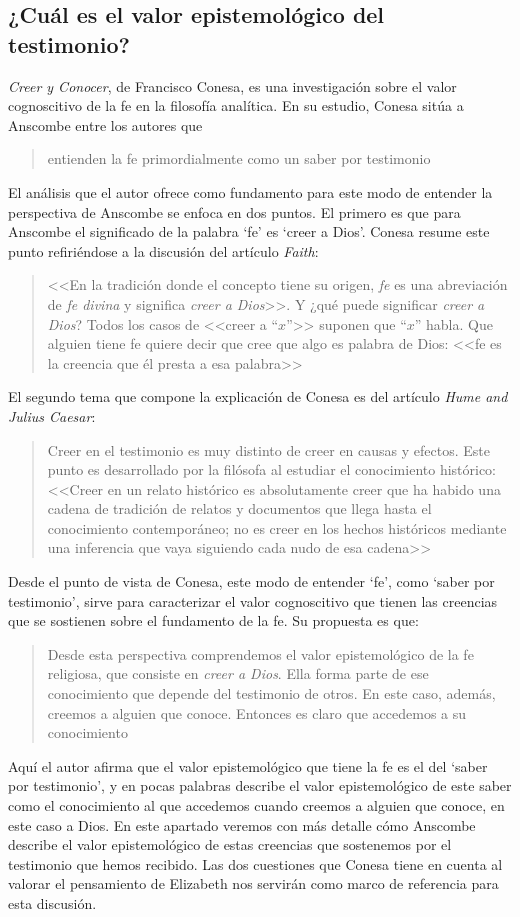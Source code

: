 \subsection{¿Cuál es el valor epistemológico del testimonio?}

\emph{Creer y Conocer}, de Francisco Conesa, es una investigación sobre el valor cognoscitivo de la fe en la filosofía analítica. En su estudio, Conesa sitúa a Anscombe entre los autores que \blockquote[{\cite[84]{conesa1994cc}}]{entienden la fe primordialmente como un saber por testimonio}. El análisis que el autor ofrece como fundamento para este modo de entender la perspectiva de Anscombe se enfoca en dos puntos. El primero es que para Anscombe el significado de la palabra `fe' es `creer a Dios'. Conesa resume este punto refiriéndose a la discusión del artículo \emph{Faith}: \blockquote[{\cite[87-88]{conesa1994cc}}]{<<En la tradición donde el concepto tiene su origen, \emph{fe} es una abreviación de \emph{fe divina} y significa \emph{creer a Dios}>>. Y ¿qué puede significar \emph{creer a Dios}? Todos los casos de <<creer a ``$x$''>> suponen que ``$x$'' habla. Que alguien tiene fe quiere decir que cree que algo es palabra de Dios: <<fe es la creencia que él presta a esa palabra>>}. El segundo tema que compone la explicación de Conesa es del artículo \emph{Hume and Julius Caesar}: \blockquote[{\cite[88]{conesa1994cc}}]{Creer en el testimonio es muy distinto de creer en causas y efectos. Este punto es desarrollado por la filósofa al estudiar el conocimiento histórico: <<Creer en un relato histórico es absolutamente creer que ha habido una cadena de tradición de relatos y documentos que llega hasta el conocimiento contemporáneo; no es creer en los hechos históricos mediante una inferencia que vaya siguiendo cada nudo de esa cadena>>}.

Desde el punto de vista de Conesa, este modo de entender `fe', como `saber por testimonio', sirve para caracterizar el valor cognoscitivo que tienen las creencias que se sostienen sobre el fundamento de la fe. Su propuesta es que: \blockquote[{\cite[88]{conesa1994cc}}]{Desde esta perspectiva comprendemos el valor epistemológico de la fe religiosa, que consiste en \emph{creer a Dios}. Ella forma parte de ese conocimiento que depende del testimonio de otros. En este caso, además, creemos a alguien que conoce. Entonces es claro que accedemos a su conocimiento}. Aquí el autor afirma que el valor epistemológico que tiene la fe es el del `saber por testimonio', y en pocas palabras describe el valor epistemológico de este saber como el conocimiento al que accedemos cuando creemos a alguien que conoce, en este caso a Dios. En este apartado veremos con más detalle cómo Anscombe describe el valor epistemológico de estas creencias que sostenemos por el testimonio que hemos recibido. Las dos cuestiones que Conesa tiene en cuenta al valorar el pensamiento de Elizabeth nos servirán como marco de referencia para esta discusión.

